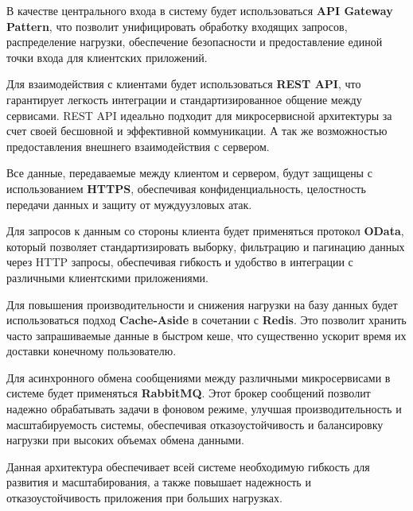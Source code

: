В качестве центрального входа в систему будет использоваться \textbf{API Gateway Pattern}, что позволит унифицировать обработку входящих запросов, распределение нагрузки, обеспечение безопасности и предоставление единой точки входа для клиентских приложений.

Для взаимодействия с клиентами будет использоваться \textbf{REST API}, что гарантирует легкость интеграции и стандартизированное общение между сервисами. REST API идеально подходит для микросервисной архитектуры за счет своей бесшовной и эффективной коммуникации. А так же возможностью предоставления внешнего взаимодействия с сервером.

Все данные, передаваемые между клиентом и сервером, будут защищены с использованием \textbf{HTTPS}, обеспечивая конфиденциальность, целостность передачи данных и защиту от муждуузловых атак.

Для запросов к данным со стороны клиента будет применяться протокол \textbf{OData}, который позволяет стандартизировать выборку, фильтрацию и пагинацию данных через HTTP запросы, обеспечивая гибкость и удобство в интеграции с различными клиентскими приложениями.

Для повышения производительности и снижения нагрузки на базу данных будет использоваться подход \textbf{Cache-Aside} в сочетании с \textbf{Redis}. Это позволит хранить часто запрашиваемые данные в быстром кеше, что существенно ускорит время их доставки конечному пользователю.

Для асинхронного обмена сообщениями между различными микросервисами в системе будет применяться \textbf{RabbitMQ}. Этот брокер сообщений позволит надежно обрабатывать задачи в фоновом режиме, улучшая производительность и масштабируемость системы, обеспечивая отказоустойчивость и балансировку нагрузки при высоких объемах обмена данными.

Данная архитектура обеспечивает всей системе необходимую гибкость для развития и масштабирования, а также повышает надежность и отказоустойчивость приложения при больших нагрузках.

